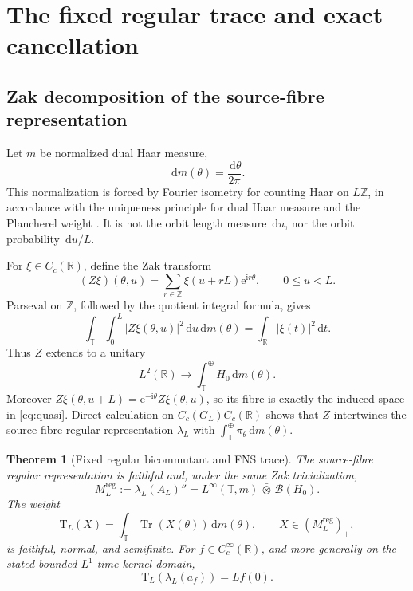\documentclass[11pt]{article}
\newtheorem{theorem}{Theorem}[section]
\theoremstyle{definition}
\newcommand{\R}{\mathbb{R}}
\newcommand{\Z}{\mathbb{Z}}
\newcommand{\T}{\mathbb{T}}
\newcommand{\B}{\mathcal{B}}
\newcommand{\dd}{\,\mathrm{d}}
\newcommand{\e}{\mathrm{e}}
\newcommand{\ii}{\mathrm{i}}
\newcommand{\Tr}{\operatorname{Tr}}
\newcommand{\Tau}{\mathrm{T}}
\begin{document}
\section{The fixed regular trace and exact cancellation}

\subsection{Zak decomposition of the source-fibre representation}

Let \(m\) be normalized dual Haar measure,
\begin{equation}
 \dd m(\theta)=\frac{\dd\theta}{2\pi}.\label{eq:dualhaar}
\end{equation}
This normalization is forced by Fourier isometry for counting Haar on \(L\Z\), in accordance with the uniqueness principle for dual Haar measure and the Plancherel weight \cite[pp.~416--418]{Renault2021}.  It is not the orbit length measure \(\dd u\), nor the orbit probability \(\dd u/L\).

For \(\xi\in C_c(\R)\), define the Zak transform
\begin{equation}
 (Z\xi)(\theta,u)=\sum_{r\in\Z}\xi(u+rL)\e^{\ii r\theta},
 \qquad 0\le u<L.\label{eq:zak}
\end{equation}
Parseval on \(\Z\), followed by the quotient integral formula, gives
\[
 \int_{\T}\int_0^L |Z\xi(\theta,u)|^2\dd u\dd m(\theta)
 =\int_{\R}|\xi(t)|^2\dd t.
\]
Thus \(Z\) extends to a unitary
\[
 L^2(\R)\longrightarrow\int_{\T}^{\oplus} H_0\dd m(\theta).
\]
Moreover \(Z\xi(\theta,u+L)=\e^{-\ii\theta}Z\xi(\theta,u)\), so its fibre is exactly the induced space in \eqref{eq:quasi}.  Direct calculation on \(C_c(G_L)C_c(\R)\) shows that \(Z\) intertwines the source-fibre regular representation \(\lambda_L\) with \(\int_{\T}^{\oplus}\pi_\theta\dd m(\theta)\).

\begin{theorem}[Fixed regular bicommutant and FNS trace]\label{thm:fns}
The source-fibre regular representation is faithful and, under the same Zak trivialization,
\begin{equation}
 M_L^{\mathrm{reg}}:=\lambda_L(A_L)''
 =L^\infty(\T,m)\,\bar\otimes\,\B(H_0).\label{eq:bicommutant}
\end{equation}
The weight
\begin{equation}
 \Tau_L(X)=\int_{\T}\Tr(X(\theta))\dd m(\theta),\qquad X\in(M_L^{\mathrm{reg}})_+,\label{eq:fns}
\end{equation}
is faithful, normal, and semifinite.  For \(f\in C_c^\infty(\R)\), and more generally on the stated bounded \(L^1\) time-kernel domain,
\begin{equation}
 \Tau_L(\lambda_L(a_f))=Lf(0).\label{eq:regular}
\end{equation}
\end{theorem}
\end{document}
